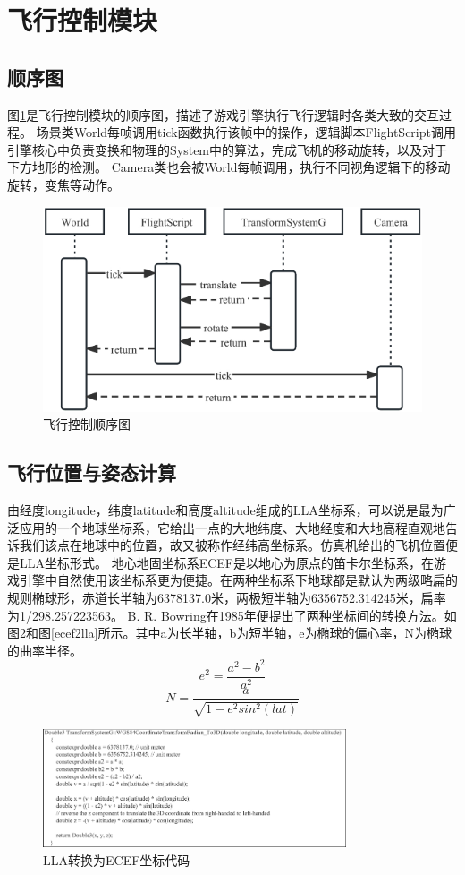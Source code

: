 \section{飞行控制模块}
\subsection{顺序图}
图\ref{seq4}是飞行控制模块的顺序图，描述了游戏引擎执行飞行逻辑时各类大致的交互过程。
场景类World每帧调用tick函数执行该帧中的操作，逻辑脚本FlightScript调用引擎核心中负责变换和物理的System中的算法，完成飞机的移动旋转，以及对于下方地形的检测。
Camera类也会被World每帧调用，执行不同视角逻辑下的移动旋转，变焦等动作。
\begin{figure}[h!]
    \begin{center}
        \includegraphics[width=.8\textwidth]{pictures/sequence4.pdf}
        \caption{飞行控制顺序图}
        \label{seq4}
    \end{center}
\end{figure}
\subsection{飞行位置与姿态计算}
由经度longitude，纬度latitude和高度altitude组成的LLA坐标系，可以说是最为广泛应用的一个地球坐标系，它给出一点的大地纬度、大地经度和大地高程直观地告诉我们该点在地球中的位置，故又被称作经纬高坐标系。仿真机给出的飞机位置便是LLA坐标形式。
地心地固坐标系ECEF是以地心为原点的笛卡尔坐标系，在游戏引擎中自然使用该坐标系更为便捷。在两种坐标系下地球都是默认为两级略扁的规则椭球形，赤道长半轴为6378137.0米，两极短半轴为6356752.314245米，扁率为1/298.257223563。
B. R. Bowring在1985年便提出了两种坐标间的转换方法\cite{cha4}。如图\ref{lla2ecef}和图\ref{ecef2lla}所示。其中a为长半轴，b为短半轴，e为椭球的偏心率，N为椭球的曲率半径。
$$e^2=\frac{a^2-b^2}{a^2}$$
$$N=\frac{a}{\sqrt{1-e^2sin^2(lat)}}$$

\begin{figure}[h!]
    \begin{center}
        \includegraphics[width=0.8\textwidth]{pictures/code23.pdf}
        \caption{LLA转换为ECEF坐标代码}
        \label{lla2ecef}
    \end{center}
\end{figure}

